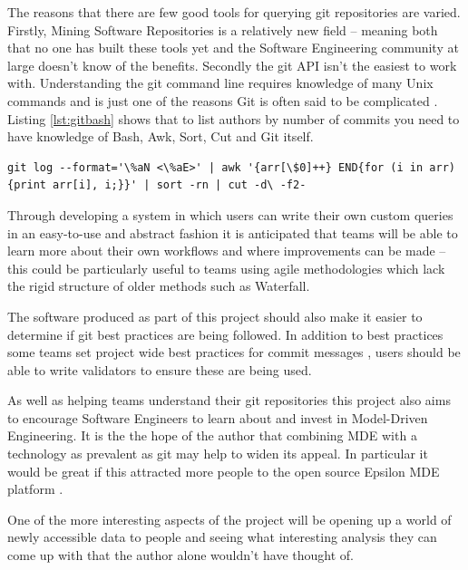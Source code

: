 \documentclass[11pt]{book}
\begin{document}
The reasons that there are few good tools for querying git repositories are varied. Firstly, Mining Software Repositories is a relatively new field --  meaning both that no one has built these tools yet and the Software Engineering community at large doesn't know of the benefits. Secondly the git API isn't the easiest to work with. Understanding the git command line requires knowledge of many Unix commands and is just one of the reasons Git is often said to be complicated \cite{gitcomplex}\cite{githard}\cite{gitmixedmetaphors}. Listing \ref{lst:gitbash} shows that to list authors by number of commits you need to have knowledge of Bash, Awk, Sort, Cut and Git itself.\\ 

\begin{lstlisting}[caption=List Authors by Number of Commits in Git Bash, label=lst:gitbash]
git log --format='\%aN <\%aE>' | awk '{arr[\$0]++} END{for (i in arr){print arr[i], i;}}' | sort -rn | cut -d\ -f2-
\end{lstlisting}

Through developing a system in which users can write their own custom queries in an easy-to-use and abstract fashion it is anticipated that teams will be able to learn more about their own workflows and where improvements can be made -- this could be particularly useful to teams using agile methodologies which lack the rigid structure of older methods such as Waterfall.

The software produced as part of this project should also make it easier to determine if git best practices \cite{gitbestpractices} are being followed. In addition to best practices some teams set project wide best practices for commit messages \cite{erlanggitcommitmessages}, users should be able to write validators to ensure these are being used.

As well as helping teams understand their git repositories this project also aims to encourage Software Engineers to learn about and invest in Model-Driven Engineering. It is the the hope of the author that combining MDE with a technology as prevalent as git may help to widen its appeal. In particular it would be great if this attracted more people to the open source Epsilon MDE platform \cite{epsilonhomepage}.

One of the more interesting aspects of the project will be opening up a world of newly accessible data to people and seeing what interesting analysis they can come up with that the author alone wouldn't have thought of.
\end{document}
